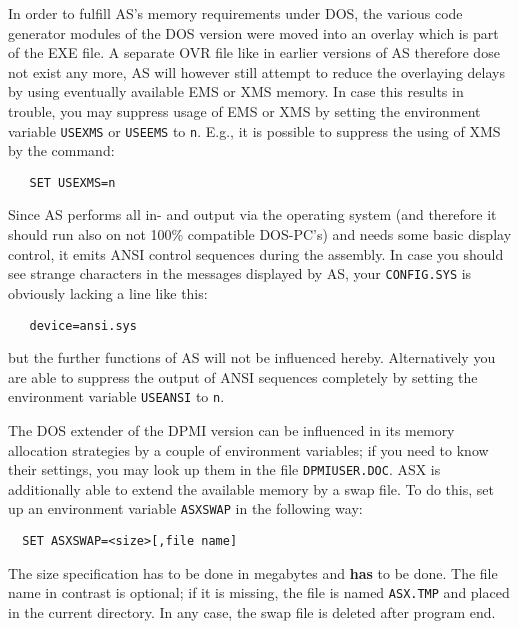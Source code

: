 \documentclass[12pt,twoside]{report}
\newcommand{\bb}[1]{{\bf #1}}
\newcommand{\tty}[1]{{\tt #1}}
\begin{document}
In order to fulfill  AS's memory requirements under
DOS, the various code generator modules of the DOS version were moved into
an overlay which is part of the EXE file.  A separate OVR file like in
earlier versions of AS therefore dose not exist any more, AS will however 
still attempt to reduce the overlaying delays by using eventually
available EMS or XMS memory.  In case this results in
trouble, you may suppress usage of EMS or XMS by setting the environment
variable \tty{USEXMS} or \tty{USEEMS} to \tty{n}.  E.g., it is possible to
suppress the using of XMS by the command:
\begin{verbatim}
   SET USEXMS=n
\end{verbatim}
Since AS performs all in- and output via the operating system (and
therefore it should run also on not 100\% compatible DOS-PC's) and
needs some basic display control, it emits ANSI control sequences
during the assembly.  
In case you  should see strange characters in the
messages displayed by AS, your \tty{CONFIG.SYS} is obviously lacking a
line like this:
\begin{verbatim}
   device=ansi.sys 
\end{verbatim}
but the further  functions of AS will not be
influenced hereby.  Alternatively you are able to suppress the output of
ANSI sequences completely by setting the environment variable
\tty{USEANSI} to \tty{n}.

The DOS extender of the DPMI version  can be
influenced in its memory allocation strategies by a couple of environment
variables; if you need to know their settings, you may look up them in the
file \tty{DPMIUSER.DOC}.  ASX is additionally able to extend the available
memory by a swap file.  To do this, set up an environment variable
\tty{ASXSWAP} in the following way:
\begin{verbatim}
  SET ASXSWAP=<size>[,file name]
\end{verbatim}
The size specification has to be done in megabytes and \bb{has} to be done.
The file name in contrast is optional; if it is missing, the file is
named \tty{ASX.TMP} and placed in the current directory.  In any case, the
swap file is deleted after program end.
\end{document}

